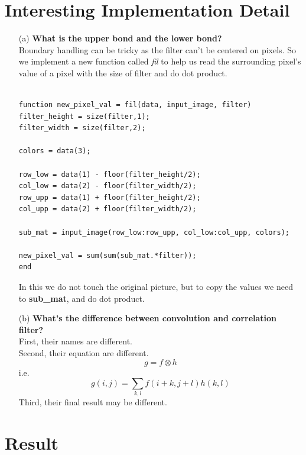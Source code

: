 \section*{Interesting Implementation Detail}
\begin{itemize}
	\item[(a)] \textbf{What is the upper bond and the lower bond?}\\
	Boundary handling can be tricky as the filter can't be centered on pixels. So we implement a new function called \textit{fil} to help us read the surrounding pixel's value of a pixel with the size of filter and do dot product.
	
	\begin{lstlisting}[style=Matlab-editor]
	
function new_pixel_val = fil(data, input_image, filter)
filter_height = size(filter,1);
filter_width = size(filter,2);

colors = data(3);

row_low = data(1) - floor(filter_height/2);
col_low = data(2) - floor(filter_width/2);
row_upp = data(1) + floor(filter_height/2);
col_upp = data(2) + floor(filter_width/2);

sub_mat = input_image(row_low:row_upp, col_low:col_upp, colors);

new_pixel_val = sum(sum(sub_mat.*filter));
end
	\end{lstlisting}
	In this we do not touch the original picture, but to copy the values we need to \textbf{sub\_mat}, and do dot product.
	\item[(b)] \textbf{What's the difference between convolution and correlation filter?}
	\\
	First, their names are different.\\
	Second, their equation are different.\\
	\begin{equation}
	g=f\otimes h
	\end{equation}
	i.e.
	\begin{equation}
g(i,j)=\sum_{k,l}f(i+k,j+l)h(k,l)
	\end{equation}
	Third, their final result may be different.
\end{itemize}

\section*{Result}

